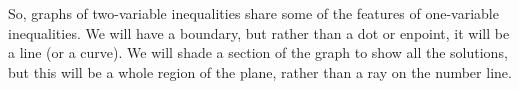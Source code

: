 
So, graphs of two-variable inequalities share some of the features of one-variable inequalities. We will have a boundary, but rather than a dot or enpoint, it will be a line (or a curve). We will shade a section of the graph to show all the solutions, but this will be a whole region of the plane, rather than a ray on the number line.

